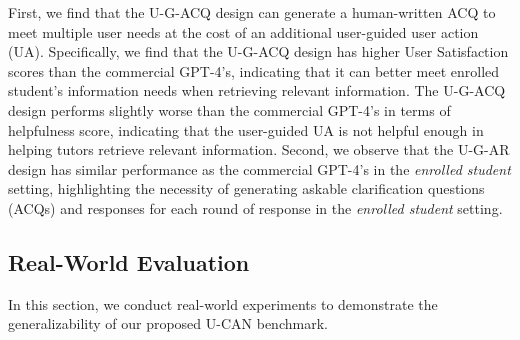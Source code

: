 \documentclass{article} %
\theoremstyle{definition}
\begin{document}
First, we find that the U-G-ACQ design can generate a human-written ACQ to meet multiple user needs at the cost of an additional user-guided user action (UA).
Specifically, we find that the U-G-ACQ design has higher User Satisfaction scores than the commercial GPT-4's, indicating that it can better meet enrolled student's information needs when retrieving relevant information.
The U-G-ACQ design performs slightly worse than the commercial GPT-4's in terms of helpfulness score, indicating that the user-guided UA is not helpful enough in helping tutors retrieve relevant information.
Second, we observe that the U-G-AR design has similar performance as the commercial GPT-4's in the \textit{enrolled student} setting, highlighting the necessity of generating askable clarification questions (ACQs) and responses for each round of response in the \textit{enrolled student} setting.


\subsection{Real-World Evaluation}
In this section, we conduct real-world experiments to demonstrate the generalizability of our proposed U-CAN benchmark.
\end{document}

